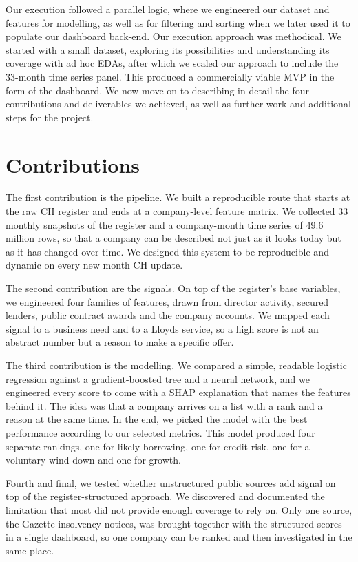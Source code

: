 \documentclass[    author={Samuel Menon Demelo; Sneha Saphala Ram Prasad; 
Viktor Ander Lindholm; Vishal Khatri},
               supervisor={Prof. Fernando Moreno-Pino},
                   degree={MSc},
                    title={Lloyds Commercial Banking Intelligence},
                 subtitle={Ranking SME Lending, Risk and Growth Prospects for Lloyds Banking Group},
                     type={},
                     year={2026}]{dissertation}
\begin{document}
Our execution followed a parallel logic, where we engineered our dataset and features for modelling, as well as for filtering and sorting when we later used it to populate our dashboard back-end. Our execution approach was methodical. We started with a small dataset, exploring its possibilities and understanding its coverage with ad hoc EDAs, after which we scaled our approach to include the 33-month time series panel. This produced a commercially viable MVP in the form of the dashboard. We now move on to describing in detail the four contributions and deliverables we achieved, as well as further work and additional steps for the project.

\section{Contributions}
The first contribution is the pipeline. We built a reproducible route that starts at the raw CH register and ends at a company-level feature matrix. We collected 33 monthly snapshots of the register and a company-month time series of 49.6 million rows, so that a company can be described not just as it looks today but as it has changed over time. We designed this system to be reproducible and dynamic on every new month CH update.

The second contribution are the signals. On top of the register's base variables, we engineered four families of features, drawn from director activity, secured lenders, public contract awards and the company accounts. We mapped each signal to a business need and to a Lloyds service, so a high score is not an abstract number but a reason to make a specific offer.

The third contribution is the modelling. We compared a simple, readable logistic regression against a gradient-boosted tree and a neural network, and we engineered every score to come with a SHAP explanation that names the features behind it. The idea was that a company arrives on a list with a rank and a reason at the same time. In the end, we picked the model with the best performance according to our selected metrics. This model produced four separate rankings, one for likely borrowing, one for credit risk, one for a voluntary wind down and one for growth.

Fourth and final, we tested whether unstructured public sources add signal on top of the register-structured approach. We discovered and documented the limitation that most did not provide enough coverage to rely on. Only one source, the Gazette insolvency notices, was brought together with the structured scores in a single dashboard, so one company can be ranked and then investigated in the same place.
\end{document}
